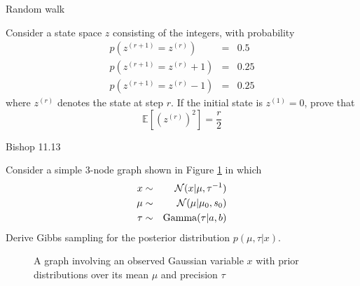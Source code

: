 \documentclass{amsmlaj}
\begin{document}
\newpage

\begin{problem}\textsf{Random walk}

Consider a state space $z$ consisting of the integers, with probability
\begin{eqnarray}
p(z^{(r+1)} = z^{(r)}) & = & 0.5 \nonumber \\
p(z^{(r+1)} = z^{(r)}+1) & = & 0.25 \nonumber \\
p(z^{(r+1)} = z^{(r)}-1) & = & 0.25 \nonumber 
\end{eqnarray}
where $z^{(r)}$ denotes the state at step $r$. If the initial state is $z^{(1)}=0$, prove that 
$$
\mathbb{E}\left[(z^{(r)})^2\right]=\frac{r}{2}
$$

\end{problem}


\begin{problem}\textsf{Bishop 11.13}

\noindent Consider a simple 3-node graph shown in Figure \ref{fig:gauss} in which
\begin{eqnarray}
x & \sim & \mathcal{N}(x|\mu,\tau^{-1}) \nonumber\\
\mu & \sim & \mathcal{N}(\mu|\mu_0,s_0) \nonumber\\
\tau & \sim & \text{Gamma}(\tau|a,b)
\end{eqnarray}
Derive Gibbs sampling for the posterior distribution $p(\mu,\tau|x)$.
\begin{figure}[H]
\begin{center}
\caption{A graph involving an observed Gaussian variable $x$ with prior distributions over its mean $\mu$ and precision $\tau$}
\label{fig:gauss}
\end{center}
\end{figure}


\end{problem}
\end{document}
